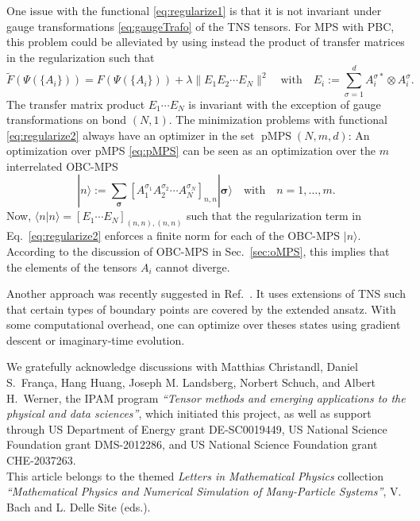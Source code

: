\documentclass[english,11pt,aps,pra,onecolumn,tightenlines,groupedaddress,superscriptaddress,notitlepage,floatfix,fleqn]{revtex4-1}
\newcommand{\bra}{\langle}
\newcommand{\ket}{\rangle}
\renewcommand{\vec}[1]{{\boldsymbol{#1}}}
\newcommand{\s}{\sigma}
\newcommand{\vs}{\vec{\sigma}}
\newcommand{\pMPS}{\operatorname{pMPS}}
\begin{document}
One issue with the functional \eqref{eq:regularize1} is that it is not invariant under gauge transformations \eqref{eq:gaugeTrafo} of the TNS tensors. For MPS with PBC, this problem could be alleviated by using instead the product of transfer matrices in the regularization such that
\begin{equation}\label{eq:regularize2}\textstyle
	\tilde{F}(\Psi(\{A_i\})) = F(\Psi(\{A_i\}))+\lambda \|E_1E_2\dotsb E_N\|^2\quad\text{with}\quad
	E_i:=\sum_{\s=1}^d A_i^{\s*}\otimes A_i^{\s}.
\end{equation}
The transfer matrix product $E_1\dotsb E_N$ is invariant with the exception of gauge transformations on bond $(N,1)$. The minimization problems with functional \eqref{eq:regularize2} always have an optimizer in the set $\pMPS(N,m,d)$: An optimization over pMPS \eqref{eq:pMPS} can be seen as an optimization over the $m$ interrelated OBC-MPS
\begin{equation}\textstyle
	|n\ket := \sum_\vs \left[ A_1^{\s_1}A_2^{\s_2}\dotsb A_N^{\s_N}\right]_{n,n}|\vs\ket \quad\text{with}\quad n=1,\dots,m.
\end{equation}
Now, $\bra n|n\ket=[E_1\dotsb E_N]_{(n,n),(n,n)}$ such that the regularization term in Eq.~\eqref{eq:regularize2} enforces a finite norm for each of the OBC-MPS $|n\ket$. According to the discussion of OBC-MPS in Sec.~\ref{sec:oMPS}, this implies that the elements of the tensors $A_i$ cannot diverge.

Another approach was recently suggested in Ref.~\cite{Christandl2021-103}. It uses extensions of TNS such that certain types of boundary points are covered by the extended ansatz. With some computational overhead, one can optimize over theses states using gradient descent or imaginary-time evolution.


\begin{acknowledgments}
We gratefully acknowledge discussions with Matthias Christandl, Daniel S.\ Fran\c{c}a, Hang Huang, Joseph M. Landsberg, Norbert Schuch, and Albert H.\ Werner, the IPAM program \emph{``Tensor methods and emerging applications to the physical and data sciences''}, which initiated this project, as well as support through US Department of Energy grant DE-SC0019449, US National Science Foundation grant DMS-2012286, and US National Science Foundation grant CHE-2037263.\\

This article belongs to the themed \emph{Letters in Mathematical Physics} collection \emph{``Mathematical Physics and Numerical Simulation of Many-Particle Systems''}, V. Bach and L. Delle Site (eds.).
\end{acknowledgments}
\end{document}
